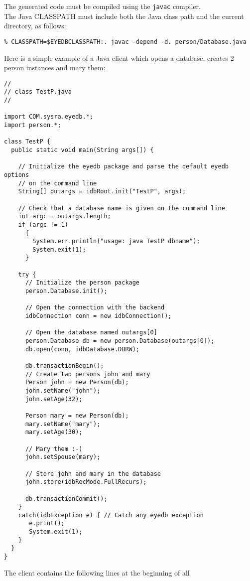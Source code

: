 The generated code must be compiled using the \texttt{javac} compiler.
\\
The Java CLASSPATH must include both the \eyedb Java class path and
the current directory, as follows:
{\verbsize \begin{verbatim}
% CLASSPATH=$EYEDBCLASSPATH:. javac -depend -d. person/Database.java 
\end{verbatim}
}

Here is a simple example of a Java client which opens a database,
creates 2 person instances and mary them:
{\verbsize \begin{verbatim}
//
// class TestP.java
//

import COM.sysra.eyedb.*;
import person.*;

class TestP {
  public static void main(String args[]) {

    // Initialize the eyedb package and parse the default eyedb options
    // on the command line
    String[] outargs = idbRoot.init("TestP", args);
     
    // Check that a database name is given on the command line
    int argc = outargs.length;
    if (argc != 1)
      {
        System.err.println("usage: java TestP dbname");
        System.exit(1);
      }

    try {
      // Initialize the person package
      person.Database.init();

      // Open the connection with the backend
      idbConnection conn = new idbConnection();

      // Open the database named outargs[0]
      person.Database db = new person.Database(outargs[0]);
      db.open(conn, idbDatabase.DBRW);

      db.transactionBegin();
      // Create two persons john and mary
      Person john = new Person(db);
      john.setName("john");
      john.setAge(32);
     
      Person mary = new Person(db);
      mary.setName("mary");
      mary.setAge(30);
     
      // Mary them :-)
      john.setSpouse(mary);

      // Store john and mary in the database
      john.store(idbRecMode.FullRecurs);

      db.transactionCommit();
    }
    catch(idbException e) { // Catch any eyedb exception
       e.print();
       System.exit(1);
    }
  }
}
\end{verbatim}
}
The client contains the following lines at the beginning of all
